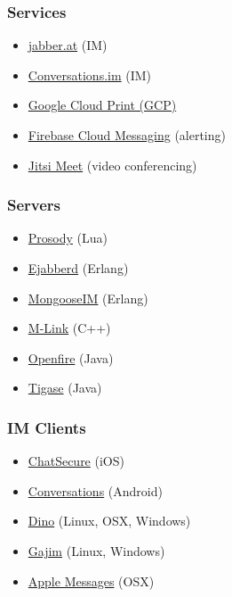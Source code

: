 \documentclass[xelatex,aspectratio=169]{beamer}
\begin{document}
\begin{frame}
	\frametitle{Services}
	\begin{itemize}
		\item\href{https://jabber.at/}{jabber.at} (IM)
		\item\href{https://account.conversations.im/}{Conversations.im} (IM)
		\item\href{https://developers.google.com/cloud-print/docs/rawxmpp}{Google Cloud Print (GCP)}
		\item\href{https://firebase.google.com/docs/cloud-messaging/server}{Firebase
			Cloud Messaging} (alerting)
		\item\href{https://meet.jit.si/}{Jitsi Meet} (video conferencing)
	\end{itemize}
\end{frame}

\begin{frame}
	\frametitle{Servers}
	\begin{itemize}
		\item\href{https://prosody.im/}{Prosody} (Lua)
		\item\href{https://www.ejabberd.im/}{Ejabberd} (Erlang)
		\item\href{https://www.erlang-solutions.com/products/mongooseim.html}{MongooseIM}
			(Erlang)
		\item\href{https://isode.com/products/m-link.html}{M-Link} (C++)
		\item\href{http://igniterealtime.org/projects/openfire/index.jsp}{Openfire}
			(Java)
		\item\href{http://tigase.net/content/tigase-xmpp-server}{Tigase} (Java)
	\end{itemize}
\end{frame}

\begin{frame}
	\frametitle{IM Clients}
	\begin{itemize}
		\item\href{https://chatsecure.org/}{ChatSecure} (iOS)
		\item\href{https://conversations.im/}{Conversations} (Android)
		\item\href{https://github.com/dino/dino}{Dino} (Linux, OSX, Windows)
		\item\href{https://gajim.org/}{Gajim} (Linux, Windows)
		\item\href{https://support.apple.com/explore/messages}{Apple Messages} (OSX)
	\end{itemize}
\end{frame}
\end{document}
